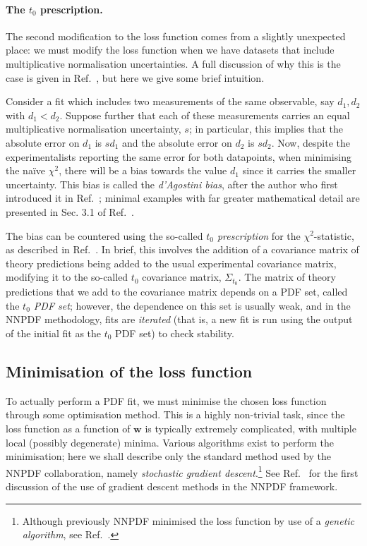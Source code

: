 \documentclass[withindex,glossary]{cam-thesis}
\renewcommand{\vec}[1]{\textbf{#1}} %
\begin{document}
\paragraph{The $t_0$ prescription.} The second modification to the loss function comes from a slightly unexpected place: we must modify the loss function when we have datasets that include multiplicative normalisation uncertainties. A full discussion of why this is the case is given in Ref.~\cite{Ball:2009qv}, but here we give some brief intuition. 

Consider a fit which includes two measurements of the same observable, say $d_1, d_2$ with $d_1 < d_2$. Suppose further that each of these measurements carries an equal multiplicative normalisation uncertainty, $s$; in particular, this implies that the absolute error on $d_1$ is $s d_1$ and the absolute error on $d_2$ is $s d_2$. Now, despite the experimentalists reporting the same error for both datapoints, when minimising the na\"{i}ve $\chi^2$, there will be a bias towards the value $d_1$ since it carries the smaller uncertainty. This bias is called the \textit{d'Agostini bias}, after the author who first introduced it in Ref.~\cite{DAgostini:1993arp}; minimal examples with far greater mathematical detail are presented in Sec. 3.1 of Ref.~\cite{Ball:2009qv}.

The bias can be countered using the so-called \textit{$t_0$ prescription} for the $\chi^2$-statistic, as described in Ref.~\cite{Ball:2009qv}. In brief, this involves the addition of a covariance matrix of theory predictions being added to the usual experimental covariance matrix, modifying it to the so-called $t_0$ covariance matrix, $\Sigma_{t_0}$. The matrix of theory predictions that we add to the covariance matrix depends on a PDF set, called the \textit{$t_0$ PDF set}; however, the dependence on this set is usually weak, and in the NNPDF methodology, fits are \textit{iterated} (that is, a new fit is run using the output of the initial fit as the $t_0$ PDF set) to check stability.

\subsection{Minimisation of the loss function}
To actually perform a PDF fit, we must minimise the chosen loss function through some optimisation method. This is a highly non-trivial task, since the loss function as a function of $\vec{w}$ is typically extremely complicated, with multiple local (possibly degenerate) minima. Various algorithms exist to perform the minimisation; here we shall describe only the standard method used by the NNPDF collaboration, namely \textit{stochastic gradient descent}.\footnote{Although previously NNPDF minimised the loss function by use of a \textit{genetic algorithm}, see Ref.~\cite{NNPDF:2014otw}.} See Ref.~\cite{Carrazza:2019mzf} for the first discussion of the use of gradient descent methods in the NNPDF framework.
\end{document}

